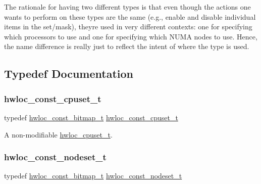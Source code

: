The rationale for having two different types is that even though the actions one wants to perform on these types are the same (e.\+g., enable and disable individual items in the set/mask), they\textquotesingle{}re used in very different contexts\+: one for specifying which processors to use and one for specifying which N\+U\+MA nodes to use. Hence, the name difference is really just to reflect the intent of where the type is used. 

\subsection{Typedef Documentation}
\mbox{\label{a00183_ga1f784433e9b606261f62d1134f6a3b25}} 
\subsubsection{\texorpdfstring{hwloc\+\_\+const\+\_\+cpuset\+\_\+t}{hwloc\_const\_cpuset\_t}}
{\footnotesize\ttfamily typedef \hyperlink{a00205_gae991a108af01d408be2776c5b2c467b2}{hwloc\+\_\+const\+\_\+bitmap\+\_\+t} \hyperlink{a00183_ga1f784433e9b606261f62d1134f6a3b25}{hwloc\+\_\+const\+\_\+cpuset\+\_\+t}}



A non-\/modifiable \hyperlink{a00183_ga4bbf39b68b6f568fb92739e7c0ea7801}{hwloc\+\_\+cpuset\+\_\+t}. 

\mbox{\label{a00183_ga2f5276235841ad66a79bedad16a5a10c}} 
\subsubsection{\texorpdfstring{hwloc\+\_\+const\+\_\+nodeset\+\_\+t}{hwloc\_const\_nodeset\_t}}
{\footnotesize\ttfamily typedef \hyperlink{a00205_gae991a108af01d408be2776c5b2c467b2}{hwloc\+\_\+const\+\_\+bitmap\+\_\+t} \hyperlink{a00183_ga2f5276235841ad66a79bedad16a5a10c}{hwloc\+\_\+const\+\_\+nodeset\+\_\+t}}



